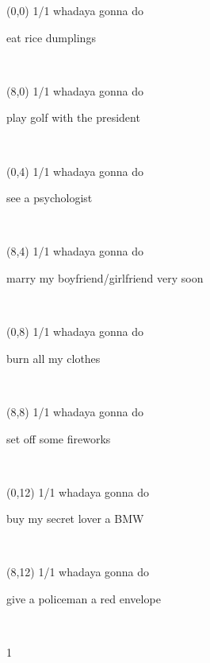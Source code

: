\documentclass[a4paper]{article}
\newcommand{\mycard}[5]{%
	\vspace{0.1cm}
	\small #1 #2
	\par
	\parbox[t][6.7cm][c]{9.5cm}{%
	\hspace{0.1cm} \Large#3\\
	\normalsize#4 #5
	}
}
\begin{document}
\selectfont

\begin{textblock}{8}(0,0)
\mycard{1/1}{whadaya gonna do}{\parbox{9.0cm}{
eat rice dumplings
}}{}{} 
\end{textblock}

\begin{textblock}{8}(8,0)
\mycard{1/1}{whadaya gonna do}{\parbox{9.0cm}{
play golf with the president
}}{}{} 
\end{textblock}

\begin{textblock}{8}(0,4)
\mycard{1/1}{whadaya gonna do}{\parbox{9.0cm}{
see a psychologist
}}{}{} 
\end{textblock}

\begin{textblock}{8}(8,4)
\mycard{1/1}{whadaya gonna do}{\parbox{9.0cm}{
marry my boyfriend/girlfriend very soon
}}{}{} 
\end{textblock}

\begin{textblock}{8}(0,8)
\mycard{1/1}{whadaya gonna do}{\parbox{9.0cm}{
burn all my clothes
}}{}{} 
\end{textblock}

\begin{textblock}{8}(8,8)
\mycard{1/1}{whadaya gonna do}{\parbox{9.0cm}{
set off some fireworks
}}{}{} 
\end{textblock}

\begin{textblock}{8}(0,12)
\mycard{1/1}{whadaya gonna do}{\parbox{9.0cm}{
buy my secret lover a BMW
}}{}{} 
\end{textblock}

\begin{textblock}{8}(8,12)
\mycard{1/1}{whadaya gonna do}{\parbox{9.0cm}{
give a policeman a red envelope
}}{}{} 
\end{textblock}

\begin{tiny}1\end{tiny}\\
\newpage
\end{document}
